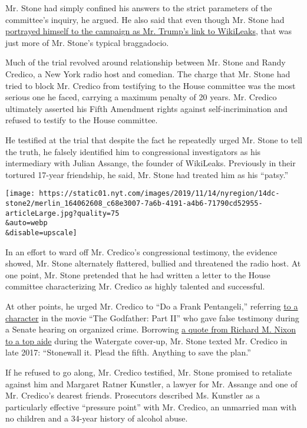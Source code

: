 Mr. Stone had simply confined his answers to the strict parameters of
the committee's inquiry, he argued. He also said that even though Mr.
Stone had
\href{https://www.nytimes.com/2018/11/01/us/politics/roger-stone-trump-campaign-mueller-wikileaks.html}{portrayed
himself to the campaign as Mr. Trump's link to WikiLeaks}, that was just
more of Mr. Stone's typical braggadocio.

Much of the trial revolved around relationship between Mr. Stone and
Randy Credico, a New York radio host and comedian. The charge that Mr.
Stone had tried to block Mr. Credico from testifying to the House
committee was the most serious one he faced, carrying a maximum penalty
of 20 years. Mr. Credico ultimately asserted his Fifth Amendment rights
against self-incrimination and refused to testify to the House
committee.

He testified at the trial that despite the fact he repeatedly urged Mr.
Stone to tell the truth, he falsely identified him to congressional
investigators as his intermediary with Julian Assange, the founder of
WikiLeaks. Previously in their tortured 17-year friendship, he said, Mr.
Stone had treated him as his ``patsy.''

\texttt{[image: https://static01.nyt.com/images/2019/11/14/nyregion/14dc-stone2/merlin\_164062608\_c68e3007-7a6b-4191-a4b6-71790cd52955-articleLarge.jpg?quality=75\\\&auto=webp\\\&disable=upscale]}

In an effort to ward off Mr. Credico's congressional testimony, the
evidence showed, Mr. Stone alternately flattered, bullied and threatened
the radio host. At one point, Mr. Stone pretended that he had written a
letter to the House committee characterizing Mr. Credico as highly
talented and successful.

At other points, he urged Mr. Credico to ``Do a Frank Pentangeli,''
referring
\href{https://www.nytimes.com/2019/11/06/movies/roger-stone-trial-the-godfather.html?module=inline}{to
a character} in the movie ``The Godfather: Part II'' who gave false
testimony during a Senate hearing on organized crime. Borrowing
\href{https://www.nytimes.com/1974/10/22/archives/jury-hears-tape-of-nixon-urgingaides-to-stonewall-balking-of.html}{a
quote from Richard M. Nixon to a top aide} during the Watergate
cover-up, Mr. Stone texted Mr. Credico in late 2017: ``Stonewall it.
Plead the fifth. Anything to save the plan.''

If he refused to go along, Mr. Credico testified, Mr. Stone promised to
retaliate against him and Margaret Ratner Kunstler, a lawyer for Mr.
Assange and one of Mr. Credico's dearest friends. Prosecutors described
Ms. Kunstler as a particularly effective ``pressure point'' with Mr.
Credico, an unmarried man with no children and a 34-year history of
alcohol abuse.

